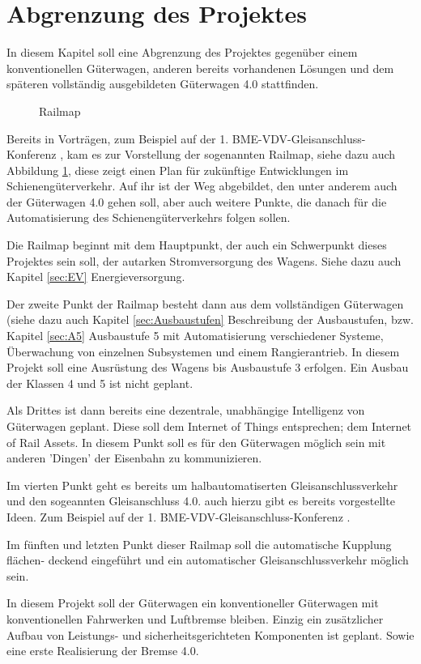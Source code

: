 \section{Abgrenzung des Projektes}
In diesem Kapitel soll eine Abgrenzung des Projektes gegenüber einem konventionellen Güterwagen, anderen bereits vorhandenen Lösungen und dem späteren vollständig ausgebildeten Güterwagen 4.0 stattfinden. \par
\begin{figure}[hbp]
    \centering
    
    \caption{Railmap \cite{GAK}}
    \label{fig:Railmap}
\end{figure}
Bereits in Vorträgen, zum Beispiel auf der 1. BME-VDV-Gleisanschluss-Konferenz \cite{GAK}, kam es zur Vorstellung der sogenannten Railmap, siehe dazu auch Abbildung \ref{fig:Railmap}, diese zeigt einen Plan für zukünftige Entwicklungen im Schienengüterverkehr. Auf ihr ist der Weg abgebildet, den unter anderem auch der Güterwagen 4.0  gehen soll, aber auch weitere Punkte, die danach für die Automatisierung des Schienengüterverkehrs folgen sollen.\par
Die Railmap beginnt mit dem Hauptpunkt, der auch ein Schwerpunkt dieses Projektes sein soll, der autarken Stromversorgung des Wagens. Siehe dazu auch Kapitel \ref{sec:EV} Energieversorgung.\par
Der zweite Punkt der Railmap besteht dann aus dem vollständigen Güterwagen (siehe dazu auch Kapitel \ref{sec:Ausbaustufen} Beschreibung der Ausbaustufen, bzw. Kapitel \ref{sec:A5} Ausbaustufe 5 mit Automatisierung verschiedener Systeme, Überwachung von einzelnen Subsystemen und einem Rangierantrieb. In diesem Projekt soll eine Ausrüstung des Wagens bis Ausbaustufe 3 erfolgen. Ein Ausbau der Klassen 4 und 5 ist nicht geplant. \par
Als Drittes ist dann bereits eine dezentrale, unabhängige Intelligenz von Güterwagen geplant. Diese soll dem Internet of Things entsprechen; dem Internet of Rail Assets. In diesem Punkt soll es für den Güterwagen möglich sein mit anderen 'Dingen' der Eisenbahn zu kommunizieren.\par
Im vierten Punkt geht es bereits um halbautomatiserten Gleisanschlussverkehr und den sogeannten Gleisanschluss 4.0. auch hierzu gibt es bereits vorgestellte Ideen. Zum Beispiel auf der 1. BME-VDV-Gleisanschluss-Konferenz \cite{GAK}. \par
Im fünften und letzten Punkt dieser Railmap soll die automatische Kupplung flächen- deckend eingeführt und ein automatischer Gleisanschlussverkehr möglich sein.\par
In diesem Projekt soll der Güterwagen ein konventioneller Güterwagen mit konventionellen Fahrwerken und Luftbremse bleiben. Einzig ein zusätzlicher Aufbau von Leistungs- und sicherheitsgerichteten Komponenten ist geplant. Sowie eine erste Realisierung der Bremse 4.0\cite{Stephenson, ETR_2}.\par


